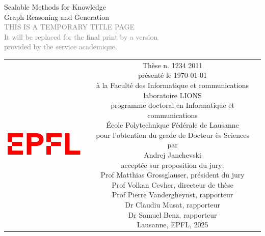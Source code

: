 \begin{titlepage}
\begin{center}
\sffamily


\null\vspace{2cm}
{\huge Scalable Methods for Knowledge \\[12pt] Graph Reasoning and Generation} \\[24pt] 
\textcolor{gray}{\small{THIS IS A TEMPORARY TITLE PAGE \\ It will be replaced for the final print by a version \\ provided by the service academique.}}
    
\vfill

\begin{tabular} {cc}
\parbox{0.3\textwidth}{\includegraphics[width=4cm]{images/Logo_EPFL.pdf}}
&
\parbox{0.7\textwidth}{%
	Thèse n. 1234 2011\\
	présenté le \today \\
	à la Faculté des Informatique et communications \\
	laboratoire LIONS\\
	programme doctoral en Informatique et communications\\
%
	École Polytechnique Fédérale de Lausanne\\[6pt]
	pour l'obtention du grade de Docteur ès Sciences\\
	par\\ [4pt]
	\null \hspace{3em} Andrej Janchevski\\[9pt]
%
\small
acceptée sur proposition du jury:\\[4pt]
%
    Prof Matthias Grossglauser, président du jury\\
    Prof Volkan Cevher, directeur de thèse\\
    Prof Pierre Vandergheynst, rapporteur\\
    Dr Claudiu Musat, rapporteur\\
    Dr Samuel Benz, rapporteur\\[12pt]
%
Lausanne, EPFL, 2025}
\end{tabular}
\end{center}
\vspace{2cm}
\end{titlepage}



